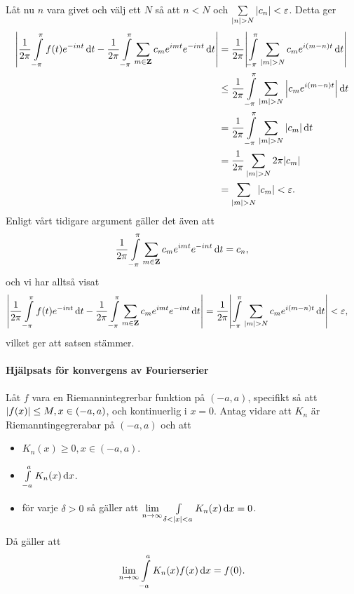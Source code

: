 Låt nu $n$ vara givet och välj ett $N$ så att $n < N$ och $\sum\limits_{\abs{n} > N}\abs{c_{n}} < \varepsilon$. Detta ger
\begin{align*}
	\abs{\frac{1}{2\pi}\int\limits_{-\pi}^{\pi}f(t)e^{-int}\dd{t} - \frac{1}{2\pi}\int\limits_{-\pi}^{\pi}\sum\limits_{m\in\mathbf{Z}}c_{m}e^{imt}e^{-int}\dd{t}} &= \frac{1}{2\pi}\abs{\int\limits_{-\pi}^{\pi}\sum\limits_{\abs{m} > N}c_{m}e^{i(m - n)t}\dd{t}} \\
	                                      &\leq \frac{1}{2\pi}\int\limits_{-\pi}^{\pi}\sum\limits_{\abs{m} > N}\abs{c_{m}e^{i(m - n)t}}\dd{t} \\
	                                      &= \frac{1}{2\pi}\int\limits_{-\pi}^{\pi}\sum\limits_{\abs{m} > N}\abs{c_{m}}\dd{t} \\
	                                      &= \frac{1}{2\pi}\sum\limits_{\abs{m} > N}2\pi\abs{c_{m}} \\
	                                      &= \sum\limits_{\abs{m} > N}\abs{c_{m}} < \varepsilon.
\end{align*}
Enligt vårt tidigare argument gäller det även att
\begin{align*}
	\frac{1}{2\pi}\int\limits_{-\pi}^{\pi}\sum\limits_{m\in\mathbf{Z}}c_{m}e^{imt}e^{-int}\dd{t} = c_{n},
\end{align*}
och vi har alltså visat
\begin{align*}
	\abs{\frac{1}{2\pi}\int\limits_{-\pi}^{\pi}f(t)e^{-int}\dd{t} - \frac{1}{2\pi}\int\limits_{-\pi}^{\pi}\sum\limits_{m\in\mathbf{Z}}c_{m}e^{imt}e^{-int}\dd{t}} &= \frac{1}{2\pi}\abs{\int\limits_{-\pi}^{\pi}\sum\limits_{\abs{m} > N}c_{m}e^{i(m - n)t}\dd{t}} < \varepsilon,
\end{align*}
vilket ger att satsen stämmer.

\paragraph{Hjälpsats för konvergens av Fourierserier}
Låt $f$ vara en Riemannintegrerbar funktion på $(-a, a)$, specifikt så att $\abs{f(x)}\leq M, x\in (-a, a)$, och kontinuerlig i $x = 0$. Antag vidare att $K_{n}$ är Riemanntingegrerabar på $(-a, a)$ och att
\begin{itemize}
	\item $K_{n}(x)\geq 0, x\in (-a, a)$.
	\item $\int\limits_{-a}^{a}K_{n}(x)\dd{x}$.
	\item för varje $\delta > 0$ så gäller att $\lim\limits_{n\to\infty}\int\limits_{\delta < \abs{x} < a}^{}K_{n}(x)\dd{x} = 0$.
\end{itemize}
Då gäller att
\begin{align*}
	\lim\limits_{n\to\infty}\int\limits_{-a}^{a}K_{n}(x)f(x)\dd{x} = f(0).
\end{align*}

